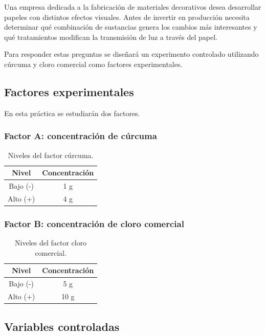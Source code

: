 Una empresa dedicada a la fabricación de materiales decorativos desea desarrollar papeles con distintos efectos visuales. Antes de invertir en producción necesita determinar qué combinación de sustancias genera los cambios más interesantes y qué tratamientos modifican la transmisión de luz a través del papel.

Para responder estas preguntas se diseñará un experimento controlado utilizando cúrcuma y cloro comercial como factores experimentales.

\subsection{Factores experimentales}

En esta práctica se estudiarán dos factores.

\subsubsection{Factor A: concentración de cúrcuma}

\begin{table}[H]
\centering
\begin{tabular}{cc}
\hline
Nivel & Concentración \\
\hline
Bajo (-) & 1 g \\
Alto (+) & 4 g \\
\hline
\end{tabular}
\caption{Niveles del factor cúrcuma.}
\end{table}

\subsubsection{Factor B: concentración de cloro comercial}

\begin{table}[H]
\centering
\begin{tabular}{cc}
\hline
Nivel & Concentración \\
\hline
Bajo (-) & 5 g \\
Alto (+) & 10 g \\
\hline
\end{tabular}
\caption{Niveles del factor cloro comercial.}
\end{table}

\subsection{Variables controladas}

